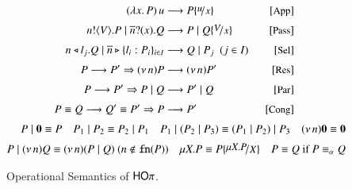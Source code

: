 \begin{figure}[!t]
	\begin{align*}
		\appl{(\abs{x}{P})}{u}   & \red  P \subst{u}{x} 
		& \orule{App} &
		\\[1mm]
		\bout{n}{V} P \Par \binp{\dual{n}}{x} Q & \red  P \Par Q \subst{V}{x} 
		& \orule{Pass} &
		\\[1mm]
		\bsel{n}{l_j} Q \Par \bbra{\dual{n}}{l_i : P_i}_{i \in I} & \red  Q \Par P_j ~~(j \in I)~~ 
		& \orule{Sel} & 
		\\[1mm]
		P \red P'\Rightarrow  \news{n} P   & \red    \news{n} P' 
		& \orule{Res} & 
		\\[1mm]
		P \red P'  \Rightarrow    P \Par Q  & \red   P' \Par Q  
		& \orule{Par} & 
		\\[1mm]
		P \scong Q \red Q' \scong P'  \Rightarrow  P  & \red  P'
		& \orule{Cong} &
	\end{align*}
	\begin{align*}
		P \Par \inact \scong P
		\quad
		P_1 \Par P_2 \scong P_2 \Par P_1
		\quad
		P_1 \Par (P_2 \Par P_3) \scong (P_1 \Par P_2) \Par P_3
		\quad
		\news{n} \inact \scong \inact
		\\[1mm]
		P \Par \news{n} Q \scong \news{n}(P \Par Q)
		\ (n \notin \fn{P})
		\quad 
		\recp{X}{P} \scong P\subst{\recp{X}{P}}{\rvar{X}}
		\quad
		P \scong Q \textrm{ if } P \scong_\alpha Q
	\end{align*}
\caption{Operational Semantics of $\mathsf{HO}\pi$. 
\label{fig:reduction}}
\end{figure}


